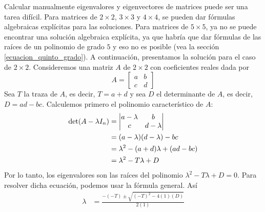 \begin{tcolorbox}[
    lower separated=false,
    theorem style=change apart,
    enhanced,
    breakable,
    boxrule=0pt,
    frame hidden,
    borderline north={1.5pt}{0pt}{black},
    borderline south={1.5pt}{0pt}{black},
    colback=white,
    coltitle=black,
    sharp corners,
    fonttitle=\bfseries\boldmath\large,
    fontupper=\normalsize,
    left=0mm,
    right=0mm,
    top=2mm,
    bottom=2mm,
    title={Un método eficiente para encontrar los eigenvalores y eigenvectores de una matriz $2 \times 2$:}
]
    \label{metodo_eigen_2x2}Calcular manualmente eigenvalores y eigenvectores de matrices puede ser una tarea difícil. Para matrices de $2 \times 2$, $3 \times 3$ y $4 \times 4$, se pueden dar fórmulas algebraicas explícitas para las soluciones. Para matrices de $5 \times 5$, ya no se puede encontrar una solución algebraica explícita, ya que habría que dar fórmulas de las raíces de un polinomio de grado $5$ y eso no es posible (vea la sección \ref{ecuacion_quinto_grado}). A continuación, presentamos la solución para el caso de $2 \times 2$. Consideremos una matriz $A$ de $2 \times 2$ con coeficientes reales dada por
    $$A = \begin{bmatrix}
        a & b \\
        c & d
    \end{bmatrix}$$
    Sea $T$ la traza de $A$, es decir, $T = a + d$ y sea $D$ el determinante de $A$, es decir, $D = ad - bc$. Calculemos primero el polinomio característico de $A$:
    \begin{align*}
        \operatorname{det}(A - \lambda I_n) & = \begin{vmatrix} a - \lambda & b \\ c & d - \lambda \end{vmatrix} \\
        & = (a - \lambda)(d - \lambda) - bc \\
        & = \lambda^2 - (a + d)\lambda + (ad - bc) \\
        & = \lambda^2 - T\lambda + D
    \end{align*}
    Por lo tanto, los eigenvalores son las raíces del polinomio $\lambda^2 - T\lambda + D = 0$. Para resolver dicha ecuación, podemos usar la fórmula general. Así
    \begin{align*}
        \lambda & = \frac{-(-T) \pm \sqrt{(-T)^2 - 4(1)(D)}}{2(1)} \\

\end{align*}
\end{tcolorbox}
